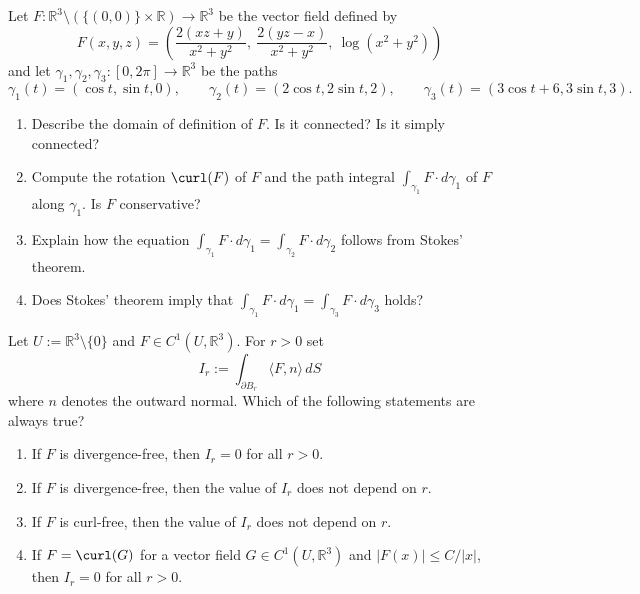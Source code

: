 \begin{exercise}
\label{ex:12.3}
Let $F : \mathbb{R}^3 \setminus (\{(0,0)\}\times\mathbb{R}) \to \mathbb{R}^3$ be the vector
field defined by
\[F(x,y,z) = \left(\frac{2(xz+y)}{x^2+y^2},\ \frac{2(yz-x)}{x^2+y^2},\ \log(x^2+y^2)\right)\]
and let $\gamma_1,\gamma_2,\gamma_3 : [0,2\pi] \to \mathbb{R}^3$ be the paths
\[\gamma_1(t) = (\cos t,\sin t,0), \qquad \gamma_2(t) = (2\cos t,2\sin t,2), \qquad
  \gamma_3(t) = (3\cos t+6,3\sin t,3).\]
\begin{enumerate}[label=\textbf{\arabic*.}]
  \item Describe the domain of definition of $F$. Is it connected? Is it simply connected?
  \item Compute the rotation $\curl(F)$ of $F$ and the path integral $\int_{\gamma_1} F\cdot
  d\gamma_1$ of $F$ along $\gamma_1$. Is $F$ conservative?
  \item Explain how the equation $\int_{\gamma_1} F\cdot d\gamma_1 = \int_{\gamma_2} F\cdot
  d\gamma_2$ follows from Stokes' theorem.
  \item Does Stokes' theorem imply that $\int_{\gamma_1} F\cdot d\gamma_1 = \int_{\gamma_3}
  F\cdot d\gamma_3$ holds?
\end{enumerate}
\end{exercise}

\begin{exercise}
\label{ex:12.4}
Let $U := \mathbb{R}^3\setminus\{0\}$ and $F \in C^1(U,\mathbb{R}^3)$. For $r>0$ set
\[I_r := \int_{\partial B_r} \langle F,n\rangle\,dS\]
where $n$ denotes the outward normal. Which of the following statements are always true?
\begin{enumerate}[label=\textbf{(\alph*)}]
  \item If $F$ is divergence-free, then $I_r=0$ for all $r>0$.
  \item If $F$ is divergence-free, then the value of $I_r$ does not depend on $r$.
  \item If $F$ is curl-free, then the value of $I_r$ does not depend on $r$.
  \item If $F = \curl(G)$ for a vector field $G \in C^1(U,\mathbb{R}^3)$ and $\lvert F(x)
  \rvert \leq C/\lvert x\rvert$, then $I_r=0$ for all $r>0$.
\end{enumerate}
\end{exercise}

